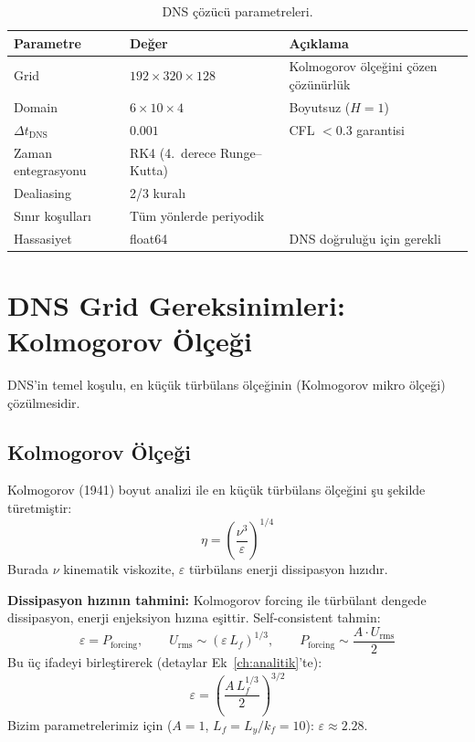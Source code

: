 \begin{table}[H]
\centering
\caption{DNS çözücü parametreleri.}
\label{tab:dns_params}
\begin{tabular}{lll}
\toprule
\textbf{Parametre} & \textbf{Değer} & \textbf{Açıklama} \\
\midrule
Grid              & $192 \times 320 \times 128$ & Kolmogorov ölçeğini çözen çözünürlük \\
Domain            & $6 \times 10 \times 4$       & Boyutsuz ($H=1$) \\
$\Delta t_{\mathrm{DNS}}$ & $0.001$ & CFL $< 0.3$ garantisi \\
Zaman entegrasyonu & RK4 (4.\ derece Runge--Kutta) & \\
Dealiasing        & 2/3 kuralı                   & \\
Sınır koşulları & Tüm yönlerde periyodik & \\
Hassasiyet        & float64                       & DNS doğruluğu için gerekli \\
\bottomrule
\end{tabular}
\end{table}


\section{DNS Grid Gereksinimleri: Kolmogorov Ölçeği}
\label{sec:dns_grid}

DNS'in temel koşulu, en küçük türbülans ölçeğinin (Kolmogorov mikro ölçeği) çözülmesidir.

\subsection{Kolmogorov Ölçeği}

Kolmogorov (1941) boyut analizi ile en küçük türbülans ölçeğini şu şekilde türetmiştir:
\begin{equation}
    \eta = \left( \frac{\nu^3}{\varepsilon} \right)^{1/4}
    \label{eq:kolmogorov_scale}
\end{equation}
Burada $\nu$ kinematik viskozite, $\varepsilon$ türbülans enerji dissipasyon hızıdır.

\textbf{Dissipasyon hızının tahmini:} Kolmogorov forcing ile türbülant dengede dissipasyon, enerji enjeksiyon hızına eşittir. Self-consistent tahmin:
\begin{equation}
    \varepsilon = P_{\text{forcing}}, \qquad
    U_{\text{rms}} \sim (\varepsilon \, L_f)^{1/3}, \qquad
    P_{\text{forcing}} \sim \frac{A \cdot U_{\text{rms}}}{2}
\end{equation}
Bu üç ifadeyi birleştirerek (detaylar Ek~\ref{ch:analitik}'te):
\begin{equation}
    \varepsilon = \left( \frac{A \, L_f^{1/3}}{2} \right)^{3/2}
    \label{eq:dissipation_estimate}
\end{equation}
Bizim parametrelerimiz için ($A=1$, $L_f = L_y/k_f = 10$): $\varepsilon \approx 2.28$.

